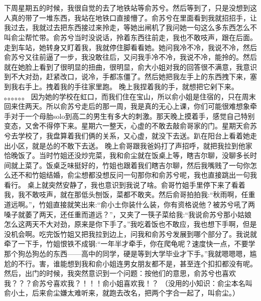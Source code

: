 \chapter{}
下周星期五的时候，我很自觉的去了地铁站等俞苏兮。然后等到了，只是没想到这人真的带了一堆东西，我站在地铁口直接懵了。俞苏兮在里面看到我就招招手，让我过去，我就过去把东西接过来拎走，等她出闸机了我问她一句这么多东西怎么不叫俞尘帮忙带。俞苏兮当时没说话，拎着东西往前走，我也不敢吱声，跟在后面。
走到车站，她转身又盯着我，我就停住脚看看她。她问我冷不冷，我说不冷，然后俞苏兮又往前逼了一步，我没敢往后，又问我手冷不冷，我说不冷，能拎的。然后就在她脸上看到了很明显的扭曲，很明显，俞大小姐对我的回答很不满意，我意识到不大对劲，赶紧改口，说冷，手都冻僵了。然后她把我左手上的东西拽下来，塞到我右手上。拽着我的手往家里跑。
晚上我捏着我的手，就想把它剁下来。
。。。。。。
因为她的学校在虹口，而我们住在宝山，所以俞小姐是住宿的，只在周末回来住两天。所以俞苏兮走后的那一周，我是真的无心上课，你们可能很难想象牵手对于一个母胎solo到高二的男生有多大的刺激。那天晚上摸着手，感觉自己特别变态，又舍不得停下来。星期六一整天，心虚的不敢去敲俞哥家的门。星期天俞苏兮去学校了，我盘算着我们俩的关系，又心虚，就没下去送。趴在阳台上看着她走出小区，就是怂的不敢下去送。
晚上俞哥跟我爸妈打了声招呼，就把我拉到他家恰晚饭了。当时竹姐还没炒完菜，我和俞尘就在饭桌上等，瞎吉尔聊，没聊多长时间就上菜了。饭桌乏味挺好的，竹姐也跟着我们瞎吉尔聊，然后我嘴贱了一句你怎么还不和竹姐结婚，俞尘想都没想反问一句那你和俞苏兮呢，我也直接跳出一句我看行。
桌上就突然安静了，我也意识到我说了啥。俞哥竹姐手里停下来了看着我，我不敢吱声，就在那低头刨饭，菜都不敢夹。然后俞哥拍拍我:“秋雨啊，任重道远啊。”，竹姐直接就笑出来:“俞小土你装什么装，你有资格说他？被苏兮吼了两嗓子就萎了两天，还任重而道远？”，又夹了一筷子菜给我:“我说俞苏兮那小姑娘怎么这两天不大对劲，原来是你下手了。”我吃着饭也不敢应，我也想下手啊，但是没机会啊。吃完饭竹姐又把我拉到边上，问我和俞苏兮发展到哪个部分了。我说就牵了一下手，竹姐恨铁不成钢:“一年半才牵手，你在爬龟呢？速度快一点，不要学那个狗怂狗怂的东西——高中的同学，硬是等到大学毕业才下手。”我就嗯嗯嗯，尴尬的不行。害，谁能想到我和俞小姐连男女朋友都不是，甚至连个扣扣都没有呢。
然后，出门的时候，我突然意识到一个问题：按他们的意思，俞苏兮也喜欢我？？？俞苏兮喜欢我？！！！俞小姐喜欢我！？
（没用的小知识：俞尘本名叫俞小土，后来俞尘嫌太难听来，就跑去改名，把两个字合一起了，叫俞尘。）

